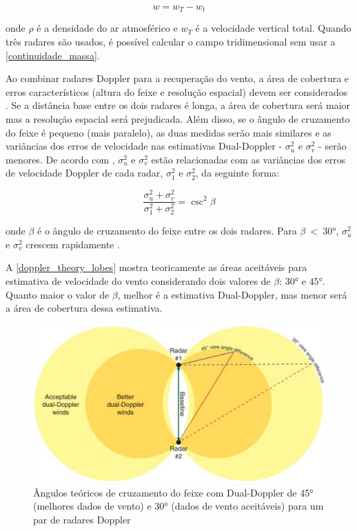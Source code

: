 \begin{equation}
	w=w_T-w_t
\end{equation}

\noindent
onde $\rho$ é a densidade do ar atmosférico e $w_T$ é a velocidade vertical total. Quando três radares são usados, é possível calcular o campo tridimensional sem usar a \autoref{continuidade_massa}.

Ao combinar radares Doppler para a recuperação do vento, a área de cobertura e erros característicos (altura do feixe e resolução espacial) devem ser considerados \cite{Dolan2007}. Se a distância base entre os dois radares é longa, a área de cobertura será maior mas a resolução espacial será prejudicada. Além disso, se o ângulo de cruzamento do feixe é pequeno (mais paralelo), as duas medidas serão mais similares e as variâncias dos erros de velocidade nas estimativas Dual-Doppler - $\sigma_u^2$ e $\sigma_v^2$ - serão menores. De acordo com , $\sigma_u^2$ e $\sigma_v^2$ estão relacionadas com as variâncias dos erros de velocidade Doppler de cada radar, $\sigma_1^2$ e $\sigma_2^2$, da seguinte forma:

\begin{equation}
	\frac{\sigma_u^2+ \sigma_v^2}{\sigma_1^2 + \sigma_2^2}=\csc^2{\beta}
\end{equation}

\noindent
onde $\beta$ é o ângulo de cruzamento do feixe entre os dois radares. Para $\beta\:<\:\ang{30}$, $\sigma_u^2$ e $\sigma_v^2$ crescem rapidamente \cite{Doviak1976, Davies-Jones1979, Doviak1993}.

A \autoref{doppler_theory_lobes} mostra teoricamente as áreas aceitáveis para estimativa de velocidade do vento considerando dois valores de $\beta$: $\ang{30}$ e $\ang{45}$. Quanto maior o valor de $\beta$, melhor é a estimativa Dual-Doppler, mas menor será a área de cobertura dessa estimativa.

\begin{figure}[htb]
	\begin{center}
		\caption{Ângulos teóricos de cruzamento do feixe com Dual-Doppler de \ang{45} (melhores dados de vento) e \ang{30} (dados de vento aceitáveis) para um par de radares Doppler} 
		\label{doppler_theory_lobes}
		\includegraphics[width=\columnwidth]{figs/lobes_eastin.png}
	\end{center}
\end{figure}

